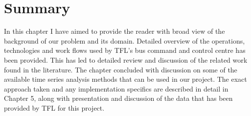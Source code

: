 \section{Summary}
In this chapter I have aimed to provide the reader with broad view of the background of our problem and its domain. Detailed overview of the operations, technologies and work flows used by TFL's bus command and control centre has been provided. This has led to detailed review and discussion of the related work found in the literature. The chapter concluded with discussion on some of the available time series analysis methods that can be used in our project. The exact approach taken and any implementation specifics are described in detail in Chapter 5, along with presentation and discussion of the data that has been provided by TFL for this project.